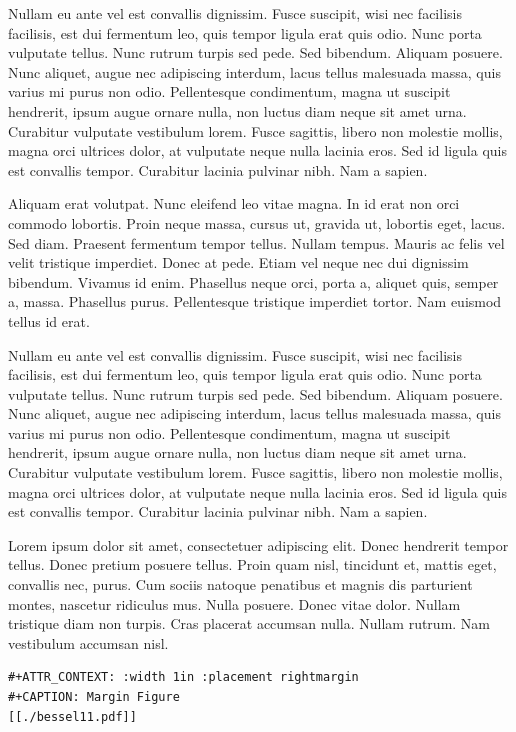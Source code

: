\documentclass[11pt]{article}
\begin{document}
\begin{enumerate}
Nullam eu ante vel est convallis dignissim. Fusce suscipit, wisi nec facilisis
facilisis, est dui fermentum leo, quis tempor ligula erat quis odio. Nunc
porta vulputate tellus. Nunc rutrum turpis sed pede. Sed bibendum. Aliquam
posuere. Nunc aliquet, augue nec adipiscing interdum, lacus tellus malesuada
massa, quis varius mi purus non odio. Pellentesque condimentum, magna ut
suscipit hendrerit, ipsum augue ornare nulla, non luctus diam neque sit amet
urna. Curabitur vulputate vestibulum lorem. Fusce sagittis, libero non
molestie mollis, magna orci ultrices dolor, at vulputate neque nulla lacinia
eros. Sed id ligula quis est convallis tempor. Curabitur lacinia pulvinar
nibh. Nam a sapien.

Aliquam erat volutpat. Nunc eleifend leo vitae magna. In id erat non orci
commodo lobortis. Proin neque massa, cursus ut, gravida ut, lobortis eget,
lacus. Sed diam. Praesent fermentum tempor tellus. Nullam tempus. Mauris ac
felis vel velit tristique imperdiet. Donec at pede. Etiam vel neque nec dui
dignissim bibendum. Vivamus id enim. Phasellus neque orci, porta a, aliquet
quis, semper a, massa. Phasellus purus. Pellentesque tristique imperdiet
tortor. Nam euismod tellus id erat.

Nullam eu ante vel est convallis dignissim. Fusce suscipit, wisi nec facilisis
facilisis, est dui fermentum leo, quis tempor ligula erat quis odio. Nunc
porta vulputate tellus. Nunc rutrum turpis sed pede. Sed bibendum. Aliquam
posuere. Nunc aliquet, augue nec adipiscing interdum, lacus tellus malesuada
massa, quis varius mi purus non odio. Pellentesque condimentum, magna ut
suscipit hendrerit, ipsum augue ornare nulla, non luctus diam neque sit amet
urna. Curabitur vulputate vestibulum lorem. Fusce sagittis, libero non
molestie mollis, magna orci ultrices dolor, at vulputate neque nulla lacinia
eros. Sed id ligula quis est convallis tempor. Curabitur lacinia pulvinar
nibh. Nam a sapien.


Lorem ipsum dolor sit amet, consectetuer adipiscing elit. Donec hendrerit
tempor tellus. Donec pretium posuere tellus. Proin quam nisl, tincidunt et,
mattis eget, convallis nec, purus. Cum sociis natoque penatibus et magnis dis
parturient montes, nascetur ridiculus mus. Nulla posuere. Donec vitae dolor.
Nullam tristique diam non turpis. Cras placerat accumsan nulla. Nullam rutrum.
Nam vestibulum accumsan nisl.

\begin{verbatim}
#+ATTR_CONTEXT: :width 1in :placement rightmargin 
#+CAPTION: Margin Figure
[[./bessel11.pdf]]
\end{verbatim}


\end{enumerate}
\end{document}
